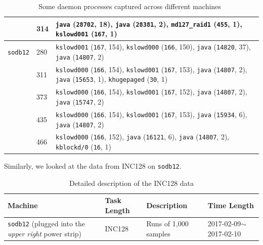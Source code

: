 \begin{table}[htp!]
{\begin{tabular}{|p{1.5cm}|p{2cm}|p{12.5cm}|}
					 & 314 & {\tt java} ({\tt 28702}, 18), {\tt java} ({\tt 28381}, 2),  {\tt md127\_raid1} ({\tt 455}, 1),  {\tt kslowd001} ({\tt 167}, 1) \\ \hline
 {\tt sodb12}  & 280 &  {\tt kslowd001} ({\tt 167}, 154),  {\tt kslowd000} ({\tt 166}, 150), {\tt java} ({\tt 14820}, 37), {\tt java} ({\tt 14807}, 2) \\ \cline{2-3}
	& 311 &  {\tt kslowd000} ({\tt 166}, 154),  {\tt kslowd001} ({\tt 167}, 153), {\tt java} ({\tt 14807}, 2), {\tt java} ({\tt 15653}, 1), {\tt khugepaged} ({\tt 30}, 1)\\ \cline{2-3}		& 373 &  {\tt kslowd000} ({\tt 166}, 154),  {\tt kslowd001} ({\tt 167}, 152), {\tt java} ({\tt 14807}, 2), {\tt java} ({\tt 15747}, 2)\\ \cline{2-3}
& 435 &  {\tt kslowd000} ({\tt 166}, 154),  {\tt kslowd001} ({\tt 167}, 153), {\tt java} ({\tt 15934}, 6), {\tt java} ({\tt 14807}, 2)\\ \cline{2-3}
& 466 &  {\tt kslowd000} ({\tt 166}, 152), {\tt java} ({\tt 16121}, 6), {\tt java} ({\tt 14807}, 2), {\tt kblockd/0} ({\tt 16}, 1)\\ \cline{2-3}
 \hline
 \end{tabular}
  }
 \caption{Some daemon processes captured across different machines~\label{tab:daemon}}
\end{table}

Similarly, we looked at the data from INC128 on {\tt sodb12}. 

\begin{table}[h]
\begin{center}
\begin{tabular}{|p{4cm}|p{3cm}|p{4cm}|p{4cm}|} \hline
Machine & Task Length & Description & Time Length\\ \hline
{\tt sodb12}  (plugged into the {\em upper right} power strip) &  INC128 & Runs of 1,000 samples & 2017-02-09$\sim$2017-02-10\\ \hline
\end{tabular}
\end{center}
\vspace{-.2in}
\caption{Detailed description of the INC128 data\label{tab:exp_notes5}}
\end{table}



